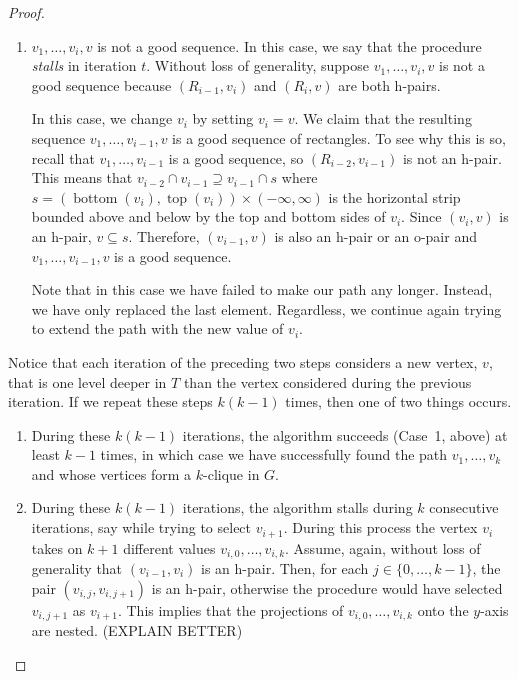 \documentclass[lotsofwhite]{patmorin}
\DeclareMathOperator{\tp}{top}
\DeclareMathOperator{\bttom}{bottom}
\begin{document}
\begin{proof}
\begin{enumerate}
     \item  $v_1,\ldots,v_i,v$ is not a good sequence.  In this case,
       we say that the procedure \emph{stalls} in iteration $t$.  Without
       loss of generality, suppose $v_1,\ldots,v_i,v$ is not a good
       sequence because $(R_{i-1},v_i)$ and $(R_i,v)$ are both h-pairs.

       In this case, we change $v_i$ by setting $v_i=v$. We claim
       that the resulting sequence $v_1,\ldots,v_{i-1},v$ is a good
       sequence of rectangles.  To see why this is so, recall that
       $v_1,\ldots,v_{i-1}$ is a good sequence, so $(R_{i-2},v_{i-1})$
       is not an h-pair.  This means that $v_{i-2}\cap v_{i-1}
       \supseteq v_{i-1}\cap s$ where $s=(\bttom(v_i),\tp(v_i))\times
       (-\infty,\infty)$ is the horizontal strip bounded above and
       below by the top and bottom sides of $v_i$.  Since $(v_{i},v)$
       is an h-pair, $v\subseteq s$.  Therefore, $(v_{i-1},v)$ is also
       an h-pair or an o-pair and $v_1,\ldots,v_{i-1},v$ is a good sequence.

       Note that in this case we have failed to make our path any
       longer. Instead, we have only replaced the last element.
       Regardless, we continue again trying to extend the path with the
       new value of $v_i$.
  \end{enumerate}
  Notice that each iteration of the preceding two steps considers a new
  vertex, $v$, that is one level deeper in $T$ than the vertex considered
  during the previous iteration.  If we repeat these steps $k(k-1)$
  times, then one of two things occurs.
  \begin{enumerate}
     \item During these $k(k-1)$ iterations, the algorithm succeeds
     (Case~1, above) at least $k-1$ times, in which case we have
     successfully found the path $v_1,\ldots,v_k$ and whose vertices
     form a $k$-clique in $G$.

     \item During these $k(k-1)$ iterations, the algorithm stalls during
     $k$ consecutive iterations, say while trying to select $v_{i+1}$.
     During this process the vertex $v_i$ takes on $k+1$ different
     values $v_{i,0},\ldots,v_{i,k}$.  Assume, again, without loss
     of generality that $(v_{i-1},v_i)$ is an h-pair.  Then, for each
     $j\in\{0,\ldots,k-1\}$, the pair $(v_{i,j}, v_{i,j+1})$ is an h-pair,
     otherwise the procedure would have selected $v_{i,j+1}$ as $v_{i+1}$.
     This implies that the projections of $v_{i,0},\ldots,v_{i,k}$
     onto the $y$-axis are nested. (EXPLAIN BETTER)


\end{enumerate}
\end{proof}
\end{document}
